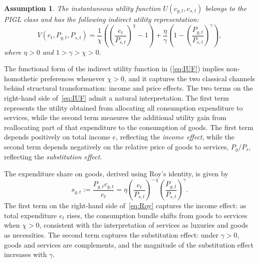\documentclass[12pt,a4paper]{article}
\newtheorem{assumption}{Assumption}
\begin{document}
\begin{assumption}\label{ass:IUF}
The instantaneous utility function \( U(c_{g,t}, c_{s,t}) \) belongs to the PIGL class and has the following indirect utility representation:
\begin{equation}\label{eq:IUF}
V(e_t, P_{g,t}, P_{s,t}) = \frac{1}{\chi} \left( \left( \frac{e_t}{P_{s,t}} \right)^\chi - 1 \right) +
\frac{\eta}{\gamma} \left( 1 - \left( \frac{P_{g,t}}{P_{s,t}} \right)^\gamma \right),
\end{equation}
where \( \eta > 0 \) and \( 1 > \gamma > \chi > 0 \).
\end{assumption}

The functional form of the indirect utility function in (\ref{eq:IUF}) implies non-homothetic preferences whenever \( \chi > 0 \), and it captures the two classical channels behind structural transformation: income and price effects.  The two terms on the right-hand side of~\eqref{eq:IUF} admit a natural interpretation. The first term represents the utility obtained from allocating all consumption expenditure to services, while the second term measures the additional utility gain from reallocating part of that expenditure to the consumption of goods. The first term depends positively on total income \( e \), reflecting the \emph{income effect}, while the second term depends negatively on the relative price of goods to services, \( P_g / P_s \), reflecting the \emph{substitution effect}.

The expenditure share on goods, derived using Roy's identity, is given by
\begin{equation}\label{eq:Roy}
s_{g,t} := \frac{P_{g,t} c_{g,t}}{e_t} = \eta \left( \frac{e_t}{P_{s,t}} \right)^{-\chi} \left( \frac{P_{g,t}}{P_{s,t}} \right)^\gamma.
\end{equation}
The first term on the right-hand side of~\eqref{eq:Roy} captures the income effect: as total expenditure \( e_t \) rises, the consumption bundle shifts from goods to services when \( \chi > 0 \), consistent with the interpretation of services as luxuries and goods as necessities. The second term captures the substitution effect: under \( \gamma > 0 \), goods and services are complements, and the magnitude of the substitution effect increases with \( \gamma \).
\end{document}
